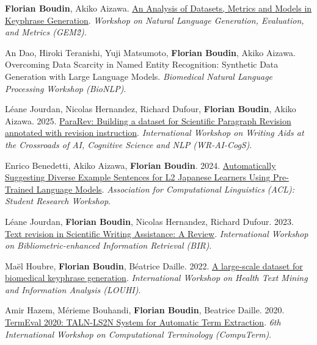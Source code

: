 \item 
\textbf{Florian Boudin}, Akiko Aizawa.
\href{https://arxiv.org/pdf/2506.10346}{An Analysis of Datasets, Metrics and Models in Keyphrase Generation}.
\textit{Workshop on Natural Language Generation, Evaluation, and Metrics (GEM\^2).}
\label{boudin-aizawa-2025-analysis}

\item
An Dao, Hiroki Teranishi, Yuji Matsumoto, \textbf{Florian Boudin}, Akiko Aizawa.
Overcoming Data Scarcity in Named Entity Recognition: Synthetic Data Generation with Large Language Models.
\textit{Biomedical Natural Language Processing Workshop (BioNLP)}.
\label{dao-etal-2025-bionlp}

\item
Léane Jourdan, Nicolas Hernandez, Richard Dufour, \textbf{Florian Boudin}, Akiko Aizawa.
2025.
\href{https://aclanthology.org/2025.wraicogs-1.4.pdf}{ParaRev: Building a dataset for Scientific Paragraph Revision annotated with revision instruction}.
\textit{International Workshop on Writing Aids at the Crossroads of AI, Cognitive Science and NLP (WR-AI-CogS)}.
\label{jourdan-etal-2025-pararev}

\item 
Enrico Benedetti, Akiko Aizawa, \textbf{Florian Boudin}.
2024.
\href{https://aclanthology.org/2024.acl-srw.11.pdf}{Automatically Suggesting Diverse Example Sentences for L2 Japanese Learners Using Pre-Trained Language Models}.
\textit{Association for Computational Linguistics (ACL): Student Research Workshop}.
\label{benedetti-etal-2024-automatically}

\item 
Léane Jourdan, \textbf{Florian Boudin}, Nicolas Hernandez, Richard Dufour.
2023.
\href{https://ceur-ws.org/Vol-3617/paper-04.pdf}{Text revision in Scientific Writing Assistance: A Review}.
\textit{International Workshop on Bibliometric-enhanced Information Retrieval (BIR)}.
\label{jourdan-etal-2023-text}

\item 
Maël Houbre, \textbf{Florian Boudin}, Béatrice Daille.
2022.
\href{https://aclanthology.org/2022.louhi-1.6.pdf}{A large-scale dataset for biomedical keyphrase generation}.
\textit{International Workshop on Health Text Mining and Information Analysis (LOUHI)}.
\label{houbre-etal-2022-large}

\item 
Amir Hazem, Mérieme Bouhandi, \textbf{Florian Boudin}, Beatrice Daille.
2020.
\href{https://aclanthology.org/2020.computerm-1.13.pdf}{TermEval 2020: TALN-LS2N System for Automatic Term Extraction}.
\textit{6th International Workshop on Computational Terminology (CompuTerm)}.
\label{hazem-etal-2020-termeval}

